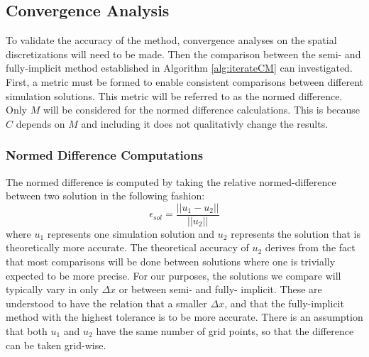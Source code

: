 
\subsection{Convergence Analysis}
  To validate the accuracy of the method, convergence analyses on the spatial discretizations will need to be made. 
  Then the comparison between the semi- and fully-implicit method established in Algorithm \ref{alg:iterateCM} can investigated.
  First, a metric must be formed to enable consistent comparisons between different simulation solutions. 
  This metric will be referred to as the normed difference. 
  Only $M$ will be considered for the normed difference calculations.
  This is because $C$ depends on $M$ and including it does not qualitativly change the results.

\subsubsection{Normed Difference Computations}

  The normed difference is computed by taking the relative normed-difference between two solution in the following fashion:
  \begin{equation} \label{equ:normed difference_comp}
    \epsilon_{sol} = \frac{||u_1 - u_2||}{||u_2||}
  \end{equation}
  where $u_1$ represents one simulation solution and $u_2$ represents the solution that is theoretically more accurate.
  The theoretical accuracy of $u_2$ derives from the fact that most comparisons will be done between solutions where one is trivially expected to be more precise.
  For our purposes, the solutions we compare will typically vary in only $\Delta x$ or between semi- and fully- implicit.
  These are understood to have the relation that a smaller $\Delta x$, and that the fully-implicit method with the highest tolerance is to be more accurate.
  There is an assumption that both $u_1$ and $u_2$ have the same number of grid points, so that the difference can be taken grid-wise.

